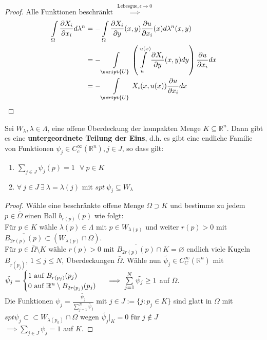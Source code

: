 \begin{proof}
  Alle Funktionen beschränkt $\overset{\text{Lebesgue}, \epsilon\to 0}{\implies}$
  \begin{align*}
  	 \int\limits_\Omega \frac{\partial X_i}{\partial x_i} d\lambda^n &= -\int\limits_\Omega \frac{\partial X_i}{\partial y} (x,y) \frac{\partial u}{\partial x_i} (x) d\lambda^n(x,y) \\
  	 &= -\int\limits_{\script{U}} \left( \int\limits_u^{u(x)} \frac{\partial X_i}{\partial y} (x,y) dy\right) \frac{\partial u}{\partial x_i} dx \\
  	 &= -\int\limits_{\script{U}} X_i (x,u(x)) \frac{\partial u}{\partial x_i} dx
  \end{align*}
\end{proof}

\begin{lemma}
  Sei $W_{\lambda}, \lambda \in \Lambda$, eine offene Überdeckung der kompakten Menge $K \subseteq \mathbb{R}^n$. Dann gibt es eine \textbf{untergeordnete Teilung der Eins}, d.h. es gibt eine endliche Familie von Funktionen $\psi_j \in C_c^{\infty}(\mathbb{R}^n), j \in J$, so dass gilt:
  \begin{enumerate}
    \item $\sum\limits_{j \in J} \psi_j(p) = 1 \ \ \ \forall \ p \in K$
    \item $\forall \ j \in J \ \exists \ \lambda = \lambda(j)$ mit $spt \ \psi_j \subseteq W_{\lambda}$
  \end{enumerate}
\end{lemma}
\begin{proof}
  Wähle eine beschränkte offene Menge $\Omega \supset K$ und bestimme zu jedem $p\in \bar{\Omega}$ einen Ball $b_{r(p)}(p)$ wie folgt: \\
  Für $p\in K$ wähle $\lambda(p)\in \Lambda$ mit $p\in W_{\lambda(p)}$ und weiter $r(p) > 0$ mit $\overline{B_{2r(p)}(p)}\subset (W_{\lambda(p)}\cap \Omega)$. \\
  Für $p\in \bar{\Omega}\setminus K$ wähle $r(p) >0 $ mit $\overline{B_{2r(p)}(p)}\cap K = \varnothing$ endlich viele Kugeln $B_{r(p_j)}$, $1\leq j \leq N$, Überdeckungen $\bar{\Omega}$. Wähle nun $\tilde{\psi_j} \in C^\infty_C(\mathbb{R}^n)$ mit $\tilde{\psi_j} = \begin{cases} 1 \text{ auf } B_{r(p_j)}(p_j) \\ 0 \text{ auf } \mathbb{R}^n\setminus B_{2r(p_j)}(p_j) \end{cases} \\
  \implies \sum\limits_{j=1}^N \tilde{\psi_j} \geq 1$ auf $\bar{\Omega}$. \\
  Die Funktionen $\psi_j = \frac{\tilde{\psi_j}}{\sum\limits_{j=1}^N \tilde{\psi_j}}$ mit $j\in J:=\{j: p_j \in K \}$ sind glatt in $\Omega$ mit $spt \psi_j \subset\subset W_{\lambda(p_k)} \cap \Omega $ wegen $\tilde{\psi_j}|_K = 0$ für $j\notin J$ \\
  $\implies \sum\limits_{j\in J} \psi_j = 1$ auf $K$.
\end{proof}

